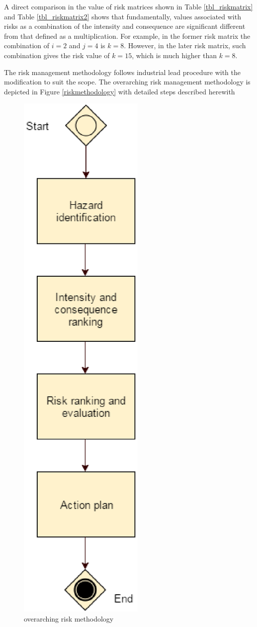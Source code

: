 \documentclass[10pt,halfline,a4paper]{ouparticle}
\begin{document}
A direct comparison in the value of risk matrices shown in Table \ref{tbl_riskmatrix} and Table \ref{tbl_riskmatrix2} shows that fundamentally, values associated with risks as a combination of the intensity and consequence are significant different from that defined as a multiplication. For example, in the former risk matrix the combination of $i=2$ and $j=4$ is $k=8$. However, in the later risk matrix, such combination gives the risk value of $k=15$, which is much higher than $k=8$. 

The risk management methodology follows industrial lead procedure with the modification to suit the scope. 
The overarching risk management methodology is depicted in Figure \ref{riskmethodology} with detailed steps described herewith

\begin{figure}[!ht]
	\centering \includegraphics[scale=0.5]{risk-methodology} \caption{overarching risk methodology}

\end{figure}
\end{document}
